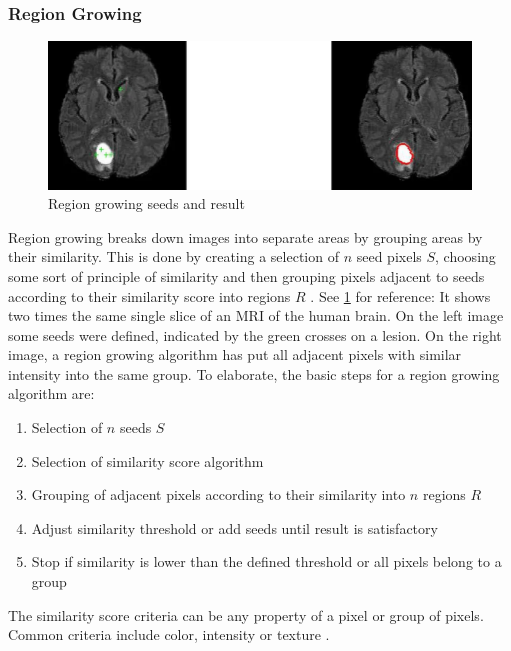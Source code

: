 \subsubsection{Region Growing}
\begin{figure}[h]
	\centerline{\includegraphics[scale=0.5]{images/regionGrowing.png}}
	\caption{Region growing seeds and result \cite{pandyaExploringImageSegmentation2024}}\label{fig:rgSR}
\end{figure}
\noindent
Region growing breaks down images into separate areas by grouping areas by their similarity.
This is done by creating a selection of $n$ seed pixels $S$, choosing some sort of principle of similarity
and then grouping pixels adjacent to seeds according to their similarity score into regions $R$ \cite{jourlinVariousContrastConcepts2016,palReviewImageSegmentation1993}.
See \cref{fig:rgSR} for reference: It shows two times the same single slice of an MRI of the human brain.
On the left image some seeds were defined, indicated by the green crosses on a lesion.
On the right image, a region growing algorithm has put all adjacent pixels with similar intensity into the same group.
To elaborate, the basic steps for a region growing algorithm are:
\begin{enumerate}
	\item Selection of $n$ seeds $S$
	\item Selection of similarity score algorithm
	\item Grouping of adjacent pixels according to their similarity into $n$ regions $R$
	\item Adjust similarity threshold or add seeds until result is satisfactory
	\item Stop if similarity is lower than the defined threshold or all pixels belong to a group
\end{enumerate}
\noindent
The similarity score criteria can be any property of a pixel or group of pixels.
Common criteria include color, intensity or texture \cite{jourlinVariousContrastConcepts2016,palReviewImageSegmentation1993}.
